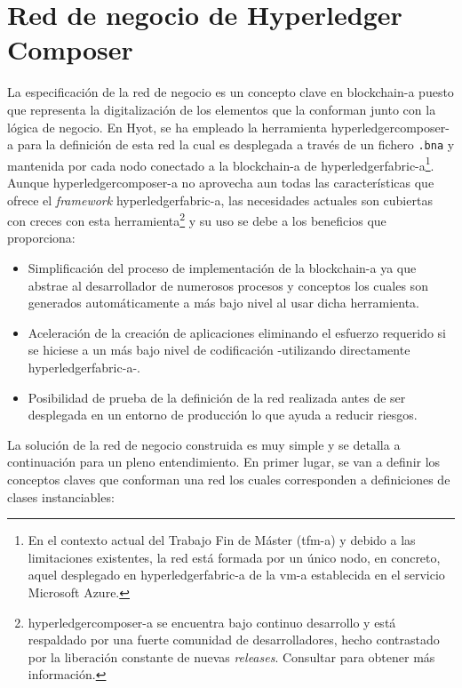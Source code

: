 \documentclass[12pt,a4paper, twoside]{report}
\begin{document}
	\section{Red de negocio de Hyperledger Composer} \label{businessNetwork}
	
	La especificación de la red de negocio es un concepto clave en \gls{blockchain-a} puesto que representa la digitalización de los elementos que la conforman junto con la lógica de negocio. En Hyot, se ha empleado la herramienta \gls{hyperledgercomposer-a} para la definición de esta red la cual es desplegada a través de un fichero \texttt{.bna} y mantenida por cada nodo conectado a la \gls{blockchain-a} de \gls{hyperledgerfabric-a}\footnote{En el contexto actual del Trabajo Fin de Máster (\gls{tfm-a}) y debido a las limitaciones existentes, la red está formada por un único nodo, en concreto, aquel desplegado en \gls{hyperledgerfabric-a} de la \gls{vm-a} establecida en el servicio Microsoft Azure.}. Aunque \gls{hyperledgercomposer-a} no aprovecha aun todas las características que ofrece el \textit{\gls{framework}} \gls{hyperledgerfabric-a}, las necesidades actuales son cubiertas con creces con esta herramienta\footnote{\gls{hyperledgercomposer-a} se encuentra bajo continuo desarrollo y está respaldado por una fuerte comunidad de desarrolladores, hecho contrastado por la liberación constante de nuevas \textit{releases}. Consultar \cite{hyperledgercomposer:releases} para obtener más información.} y su uso se debe a los beneficios que proporciona:
	
	\begin{itemize}
		\item Simplificación del proceso de implementación de la \gls{blockchain-a} ya que abstrae al desarrollador de numerosos procesos y conceptos los cuales son generados automáticamente a más bajo nivel al usar dicha herramienta.
		\item Aceleración de la creación de aplicaciones eliminando el esfuerzo requerido si se hiciese a un más bajo nivel de codificación -utilizando directamente \gls{hyperledgerfabric-a}-.
		\item Posibilidad de prueba de la definición de la red realizada antes de ser desplegada en un entorno de producción lo que ayuda a reducir riesgos.
	\end{itemize}
	
	La solución de la red de negocio construida es muy simple y se detalla a continuación para un pleno entendimiento. En primer lugar, se van a definir los conceptos claves que conforman una red los cuales corresponden a definiciones de clases instanciables:
	
\end{document}
